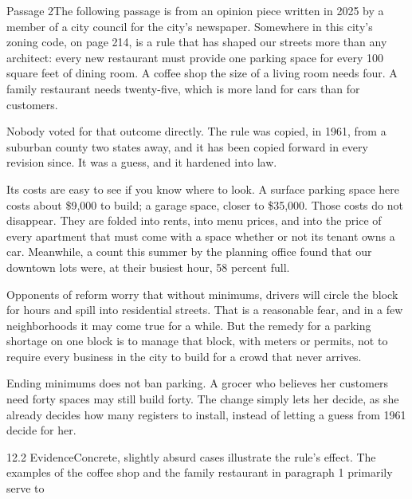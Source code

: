 \documentclass[11pt]{article}
\begin{document}
\begin{passage}{Passage 2}{The following passage is from an opinion piece written in 2025 by a member of a city council for the city's newspaper.}
 Somewhere in this city's zoning code, on page 214, is a rule that has shaped our streets more than any architect: every new restaurant must provide one parking space for every 100 square feet of dining room. A coffee shop the size of a living room needs four. A family restaurant needs twenty-five, which is more land for cars than for customers.

 Nobody voted for that outcome directly. The rule was copied, in 1961, from a suburban county two states away, and it has been copied forward in every revision since. It was a guess, and it hardened into law.

 Its costs are easy to see if you know where to look. A surface parking space here costs about \$9,000 to build; a garage space, closer to \$35,000. Those costs do not disappear. They are folded into rents, into menu prices, and into the price of every apartment that must come with a space whether or not its tenant owns a car. Meanwhile, a count this summer by the planning office found that our downtown lots were, at their busiest hour, 58 percent full.

 Opponents of reform worry that without minimums, drivers will circle the block for hours and spill into residential streets. That is a reasonable fear, and in a few neighborhoods it may come true for a while. But the remedy for a parking shortage on one block is to manage that block, with meters or permits, not to require every business in the city to build for a crowd that never arrives.

 Ending minimums does not ban parking. A grocer who believes her customers need forty spaces may still build forty. The change simply lets her decide, as she already decides how many registers to install, instead of letting a guess from 1961 decide for her.
\end{passage}

\begin{q}{1}{2.2 Evidence}{Concrete, slightly absurd cases illustrate the rule's effect.}
The examples of the coffee shop and the family restaurant in paragraph 1 primarily serve to
\end{q}
\end{document}
